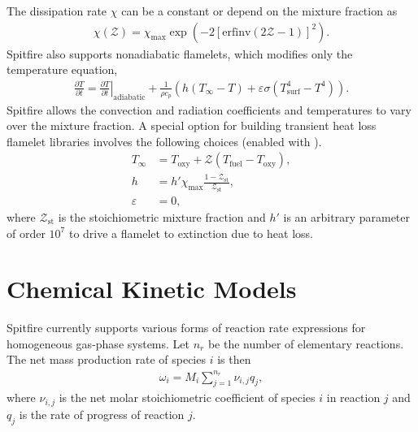 \documentclass[letterpaper,10pt,english]{sphinxmanual}
\begin{document}
The dissipation rate \(\chi\) can be a constant or depend on the mixture fraction as
\begin{equation}\label{equation:combustion:combustion:1}
\begin{split}\chi(\mathcal{Z}) = \chi_{\mathrm{max}} \exp\left( -2\left[\mathrm{erfinv}(2\mathcal{Z}-1)\right]^2 \right).\end{split}
\end{equation}
Spitfire also supports nonadiabatic flamelets, which modifies only the temperature equation,
\begin{equation}\label{equation:combustion:nonadiabatic_flamelet_T_eqn}
\begin{split}\frac{\partial T}{\partial t} = \left.\frac{\partial T}{\partial t}\right|_{\mathrm{adiabatic}} + \frac{1}{\rho c_p}\left(h(T_\infty - T) + \varepsilon\sigma(T_\mathrm{surf}^4 - T^4)\right).\end{split}
\end{equation}
Spitfire allows the convection and radiation coefficients and temperatures to vary over the mixture fraction.
A special option for building transient heat loss flamelet libraries involves the following choices
(enabled with ).
\begin{equation}\label{equation:combustion:combustion:2}
\begin{split}T_\infty &= T_\mathrm{oxy} + \mathcal{Z}(T_\mathrm{fuel} - T_\mathrm{oxy}), \\
h &= h' \chi_{\mathrm{max}} \frac{1 - \mathcal{Z}_{\mathrm{st}} }{ \mathcal{Z}_{\mathrm{st}} }, \\
\varepsilon &= 0,\end{split}
\end{equation}
where \(\mathcal{Z}_{\mathrm{st}}\) is the stoichiometric mixture fraction and
\(h'\) is an arbitrary parameter of order \(10^7\) to drive a flamelet to extinction due to heat loss.


\section{Chemical Kinetic Models}
\label{\detokenize{combustion:chemical-kinetic-models}}
Spitfire currently supports various forms of reaction rate expressions for homogeneous gas-phase systems.
Let \(n_r\) be the number of elementary reactions.
The net mass production rate of species \(i\) is then
\begin{equation}\label{equation:combustion:combustion:3}
\begin{split}\omega_i = M_i \sum_{j=1}^{n_r}\nu_{i,j}q_j,\end{split}
\end{equation}
where \(\nu_{i,j}\) is the net molar stoichiometric coefficient of species \(i\) in reaction \(j\) and \(q_j\) is the rate of progress of reaction \(j\).
\end{document}
